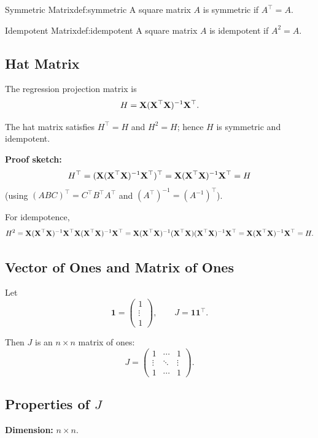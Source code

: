 \begin{defn}{Symmetric Matrix}{def:symmetric}
A square matrix $A$ is symmetric if $A^\top = A$.
\end{defn}

\begin{defn}{Idempotent Matrix}{def:idempotent}
A square matrix $A$ is idempotent if $A^2 = A$.
\end{defn}

\subsection{Hat Matrix}

The regression projection matrix is
\[
H = \mathbf{X}(\mathbf{X}^\top \mathbf{X})^{-1}\mathbf{X}^\top.
\]

The hat matrix satisfies $H^\top = H$ and $H^2 = H$; hence $H$ is symmetric and idempotent.

\textbf{Proof sketch:}
\[
H^\top = (\mathbf{X}(\mathbf{X}^\top \mathbf{X})^{-1}\mathbf{X}^\top)^\top
= \mathbf{X}(\mathbf{X}^\top \mathbf{X})^{-1}\mathbf{X}^\top
= H
\]
(using $(ABC)^\top = C^\top B^\top A^\top$ and $(A^\top)^{-1} = (A^{-1})^\top$).

For idempotence,
\[
H^2 = \mathbf{X}(\mathbf{X}^\top \mathbf{X})^{-1}\mathbf{X}^\top \mathbf{X}(\mathbf{X}^\top \mathbf{X})^{-1}\mathbf{X}^\top
= \mathbf{X}(\mathbf{X}^\top \mathbf{X})^{-1}(\mathbf{X}^\top \mathbf{X})(\mathbf{X}^\top \mathbf{X})^{-1}\mathbf{X}^\top
= \mathbf{X}(\mathbf{X}^\top \mathbf{X})^{-1}\mathbf{X}^\top = H.
\]

\subsection{Vector of Ones and Matrix of Ones}

Let
\[
\mathbf{1} =
\begin{pmatrix}
1\\
\vdots\\
1
\end{pmatrix}, \qquad
J = \mathbf{1}\mathbf{1}^{\top}.
\]

Then $J$ is an $n \times n$ matrix of ones:
\[
J =
\begin{pmatrix}
1 & \cdots & 1\\
\vdots & \ddots & \vdots\\
1 & \cdots & 1
\end{pmatrix}.
\]

\subsection{Properties of $J$}

\textbf{Dimension:} $n \times n$.

